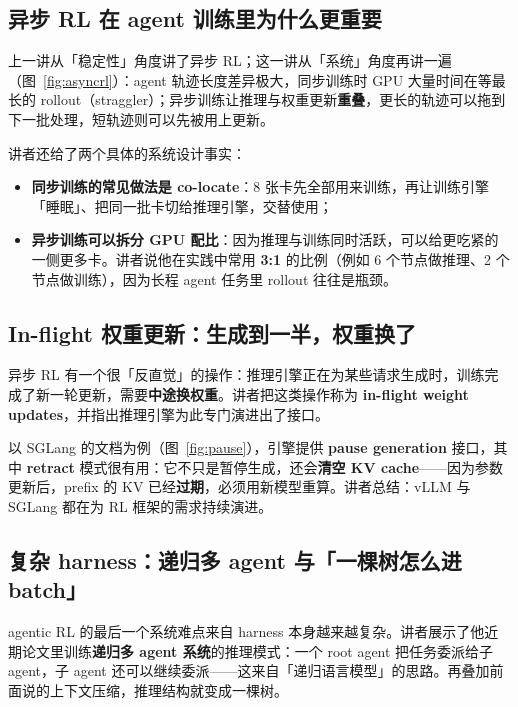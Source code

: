 \documentclass[a4paper]{article}
\begin{document}
\subsection{异步 RL 在 agent 训练里为什么更重要}

上一讲从「稳定性」角度讲了异步 RL；这一讲从「系统」角度再讲一遍（图~\ref{fig:asyncrl}）：agent 轨迹长度差异极大，同步训练时 GPU 大量时间在等最长的 rollout（straggler）；异步训练让推理与权重更新\textbf{重叠}，更长的轨迹可以拖到下一批处理，短轨迹则可以先被用上更新。

讲者还给了两个具体的系统设计事实：

\begin{itemize}
\item \textbf{同步训练的常见做法是 co-locate}：8 张卡先全部用来训练，再让训练引擎「睡眠」、把同一批卡切给推理引擎，交替使用；\item \textbf{异步训练可以拆分 GPU 配比}：因为推理与训练同时活跃，可以给更吃紧的一侧更多卡。讲者说他在实践中常用 \textbf{3:1} 的比例（例如 6 个节点做推理、2 个节点做训练），因为长程 agent 任务里 rollout 往往是瓶颈。
\end{itemize}

\subsection{In-flight 权重更新：生成到一半，权重换了}

异步 RL 有一个很「反直觉」的操作：推理引擎正在为某些请求生成时，训练完成了新一轮更新，需要\textbf{中途换权重}。讲者把这类操作称为 \textbf{in-flight weight updates}，并指出推理引擎为此专门演进出了接口。

以 SGLang 的文档为例（图~\ref{fig:pause}），引擎提供 \textbf{pause generation} 接口，其中 \textbf{retract} 模式很有用：它不只是暂停生成，还会\textbf{清空 KV cache}——因为参数更新后，prefix 的 KV 已经\textbf{过期}，必须用新模型重算。讲者总结：vLLM 与 SGLang 都在为 RL 框架的需求持续演进。

\subsection{复杂 harness：递归多 agent 与「一棵树怎么进 batch」}

agentic RL 的最后一个系统难点来自 harness 本身越来越复杂。讲者展示了他近期论文里训练\textbf{递归多 agent 系统}的推理模式：一个 root agent 把任务委派给子 agent，子 agent 还可以继续委派——这来自「递归语言模型」的思路。再叠加前面说的上下文压缩，推理结构就变成一棵树。
\end{document}
